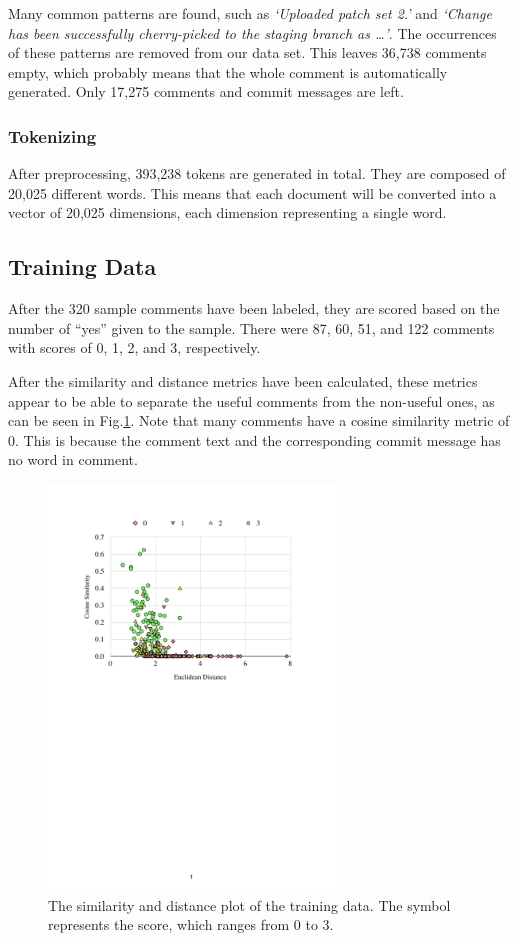 \documentclass[conference]{IEEEtran}
\begin{document}
Many common patterns are found, such as \emph{`Uploaded patch set 2.'} and \emph{`Change has been successfully cherry-picked to the staging branch as \dots'}.
The occurrences of these patterns are removed from our data set.
This leaves 36,738 comments empty, which probably means that the whole comment is automatically generated.
Only 17,275 comments and commit messages are left.

\subsubsection{Tokenizing}

After preprocessing, 393,238 tokens are generated in total. They are composed of 20,025 different words.
This means that each document will be converted into a vector of 20,025 dimensions, each dimension representing a single word.



\subsection{Training Data}

After the 320 sample comments have been labeled,
they are scored based on the number of ``yes'' given to the sample.
There were 87, 60, 51, and 122 comments with scores of 0, 1, 2, and 3, respectively.

After the similarity and distance metrics have been calculated,
these metrics appear to be able to separate the useful comments from the non-useful ones,
as can be seen in Fig.\ref{fig:scatter}.
Note that many comments have a cosine similarity metric of 0.
This is because the comment text and the corresponding commit message has no word in comment.

\begin{figure}[h]
\centering
\includegraphics[width=3in]{scatter}
\caption{The similarity and distance plot of the training data.
The symbol represents the score, which ranges from 0 to 3.}
\label{fig:scatter}
\end{figure}
\end{document}
